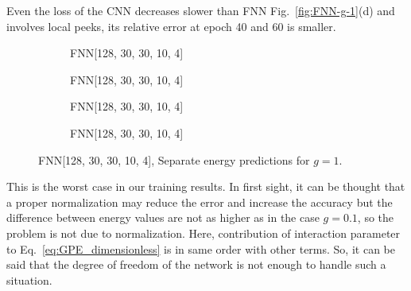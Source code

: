 \documentclass[a4paper,times,12pt]{article}
\begin{document}
Even the loss of the CNN decreases slower than FNN Fig.~\ref{fig:FNN-g-1}(d) and involves local peeks, its relative error at epoch 40 and 60 is smaller. 

\begin{figure}[H]
    \centering
    \begin{subfigure}[t]{0.45\textwidth}
		\centering
        
        \caption{FNN[128, 30, 30, 10, 4]}
		\label{fig:a}
    \end{subfigure}
    \begin{subfigure}[t]{0.45\textwidth}
		\centering
        
        \caption{FNN[128, 30, 30, 10, 4]}
		\label{fig:b}
    \end{subfigure}    
    \begin{subfigure}[t]{0.45\textwidth}
        \centering
        
        \caption{FNN[128, 30, 30, 10, 4]}
		\label{fig:c}
    \end{subfigure}
    \begin{subfigure}[t]{0.45\textwidth}
        \centering
        
        \caption{FNN[128, 30, 30, 10, 4]}
		\label{fig:c}
    \end{subfigure}
	\caption{FNN[128, 30, 30, 10, 4], Separate energy predictions for $g = 1$.}
\label{fig:FFN-g-1-S}
\end{figure}

This is the worst case in our training results. In first sight, it can be thought that a proper normalization may reduce the error and increase the accuracy but the difference between energy values are not as higher as in the case $g = 0.1$, so the problem is not due to normalization. Here, contribution of interaction parameter to Eq.~\ref{eq:GPE_dimensionless} is in same order with other terms. So, it can be said that the degree of freedom of the network is not enough to handle such a situation.
\end{document}
